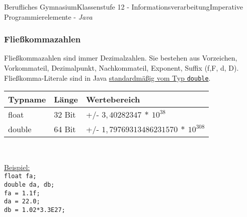 \documentclass[oneside,openany,headings=optiontotoc,11pt,numbers=noenddot]{article}
\begin{document}
\begin{worksheet}{Berufliches Gymnasium}{Klassenstufe 12 - Informationsverarbeitung}{Imperative Programmierelemente - \textit{Java}}
		\subsubsection{Fließkommazahlen}
		Fließkommazahlen sind immer Dezimalzahlen. Sie bestehen aus Vorzeichen, Vorkommateil, Dezimalpunkt, Nachkommateil, Exponent, Suffix (f,F, d, D).\\
		Fließkomma-Literale sind in Java \underline{standardmäßig vom Typ \lstinline[style=JavaInputStyle]|double|}.\\
		\par\noindent
		\begin{tabularx}{\textwidth}{|l|l|X|}
			\hline
			\textbf{Typname} & \textbf{Länge} & \textbf{Wertebereich}\\
			\hline
			float & 32 Bit & +/- \(3,40282347\ *\ 10^{38}\)\\
			\hline
			double & 64 Bit & +/- \(1,79769313486231570\ *\ 10^{308}\)\\
			\hline
		\end{tabularx}\\
		\par\noindent
		\underline{Beispiel:}\\
		\lstinline[style=JavaInputStyle]|float fa;|\\
		\lstinline[style=JavaInputStyle]|double da, db;|\\
		\lstinline[style=JavaInputStyle]|fa = 1.1f;|\\
		\lstinline[style=JavaInputStyle]|da = 22.0;|\\
		\lstinline[style=JavaInputStyle]|db = 1.02*3.3E27;|\\

\end{worksheet}
\end{document}
